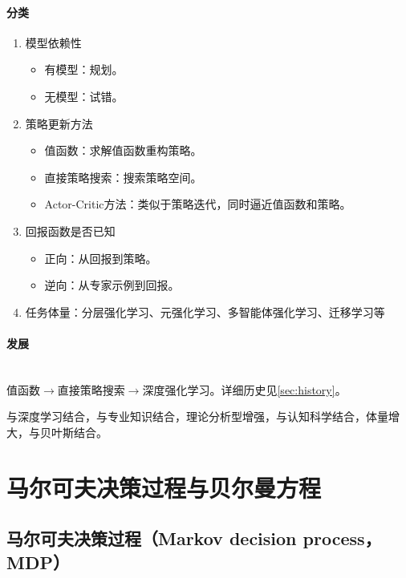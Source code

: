 \documentclass[
12pt, %
a4paper, 
oneside, %
headinclude,footinclude, %
]{scrartcl}
\begin{document}
\paragraph{分类}
\begin{enumerate}
\item 模型依赖性
\begin{itemize}
\item 有模型：规划。
\item 无模型：试错。
\end{itemize}
\item 策略更新方法
\begin{itemize}
\item 值函数：求解值函数重构策略。
\item 直接策略搜索：搜索策略空间。
\item Actor-Critic方法：类似于策略迭代，同时逼近值函数和策略。
\end{itemize}
\item 回报函数是否已知
\begin{itemize}
\item 正向：从回报到策略。
\item 逆向：从专家示例到回报。
\end{itemize}
\item 任务体量：分层强化学习、元强化学习、多智能体强化学习、迁移学习等
\end{enumerate}
\paragraph{发展}\label{sec:history back}~\\

值函数$ \rightarrow $直接策略搜索$ \rightarrow $深度强化学习。详细历史见\ref{sec:history}。

与深度学习结合，与专业知识结合，理论分析型增强，与认知科学结合，体量增大，与贝叶斯结合。
\section{马尔可夫决策过程与贝尔曼方程}
\subsection[马尔可夫决策过程]{马尔可夫决策过程（Markov decision process，MDP）}
\end{document}

